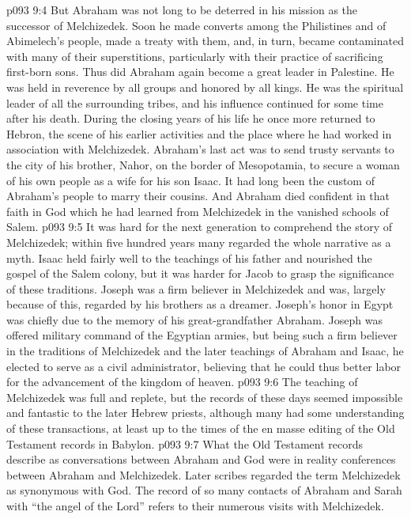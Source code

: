 \vs p093 9:4 But Abraham was not long to be deterred in his mission as the successor of Melchizedek. Soon he made converts among the Philistines and of Abimelech’s people, made a treaty with them, and, in turn, became contaminated with many of their superstitions, particularly with their practice of sacrificing first\hyp{}born sons. Thus did Abraham again become a great leader in Palestine. He was held in reverence by all groups and honored by all kings. He was the spiritual leader of all the surrounding tribes, and his influence continued for some time after his death. During the closing years of his life he once more returned to Hebron, the scene of his earlier activities and the place where he had worked in association with Melchizedek. Abraham’s last act was to send trusty servants to the city of his brother, Nahor, on the border of Mesopotamia, to secure a woman of his own people as a wife for his son Isaac. It had long been the custom of Abraham’s people to marry their cousins. And Abraham died confident in that faith in God which he had learned from Melchizedek in the vanished schools of Salem.
\vs p093 9:5 \pc It was hard for the next generation to comprehend the story of Melchizedek; within five hundred years many regarded the whole narrative as a myth. Isaac held fairly well to the teachings of his father and nourished the gospel of the Salem colony, but it was harder for Jacob to grasp the significance of these traditions. Joseph was a firm believer in Melchizedek and was, largely because of this, regarded by his brothers as a dreamer. Joseph’s honor in Egypt was chiefly due to the memory of his great\hyp{}grandfather Abraham. Joseph was offered military command of the Egyptian armies, but being such a firm believer in the traditions of Melchizedek and the later teachings of Abraham and Isaac, he elected to serve as a civil administrator, believing that he could thus better labor for the advancement of the kingdom of heaven.
\vs p093 9:6 The teaching of Melchizedek was full and replete, but the records of these days seemed impossible and fantastic to the later Hebrew priests, although many had some understanding of these transactions, at least up to the times of the en masse editing of the Old Testament records in Babylon.
\vs p093 9:7 What the Old Testament records describe as conversations between Abraham and God were in reality conferences between Abraham and Melchizedek. Later scribes regarded the term Melchizedek as synonymous with God. The record of so many contacts of Abraham and Sarah with “the angel of the Lord” refers to their numerous visits with Melchizedek.
